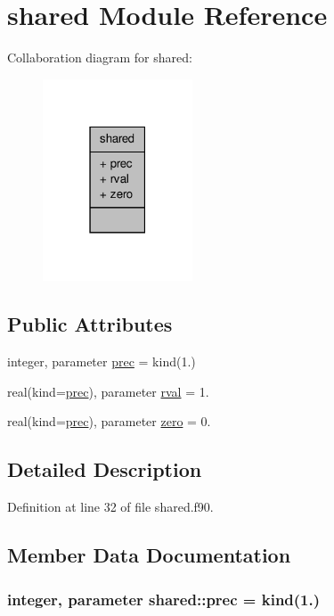\hypertarget{classshared}{\section{shared Module Reference}
\label{classshared}
}


Collaboration diagram for shared\-:\nopagebreak
\begin{figure}[H]
\begin{center}
\leavevmode
\includegraphics[width=126pt]{classshared__coll__graph}
\end{center}
\end{figure}
\subsection*{Public Attributes}
\begin{DoxyCompactItemize}
\item 
integer, parameter \hyperlink{classshared_a6d09f77f416c87d20c860fa9ee67f043}{prec} = kind(1.)
\item 
real(kind=\hyperlink{classshared_a6d09f77f416c87d20c860fa9ee67f043}{prec}), parameter \hyperlink{classshared_a1e6d2e57c52bc7d2d6e76ff50759bb36}{rval} = 1.
\item 
real(kind=\hyperlink{classshared_a6d09f77f416c87d20c860fa9ee67f043}{prec}), parameter \hyperlink{classshared_a12330d78292ab20be87d5801140eaef0}{zero} = 0.
\end{DoxyCompactItemize}


\subsection{Detailed Description}


Definition at line 32 of file shared.\-f90.



\subsection{Member Data Documentation}
\hypertarget{classshared_a6d09f77f416c87d20c860fa9ee67f043}{
\subsubsection[{prec}]{\setlength{\rightskip}{0pt plus 5cm}integer, parameter shared\-::prec = kind(1.)}}\label{classshared_a6d09f77f416c87d20c860fa9ee67f043}


